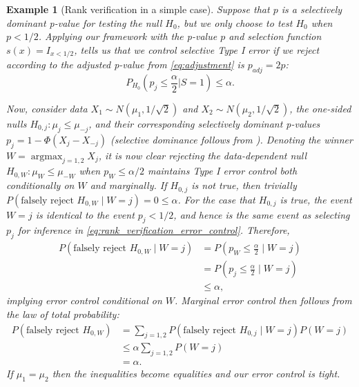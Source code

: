 \documentclass{article}
\DeclareMathOperator*{\argmax}{argmax}
\newtheorem{example}{Example}
\begin{document}
\begin{example}[Rank verification in a simple case]
\label{exm:rank_verification}
Suppose that $p$ is a selectively dominant p-value for testing the null $H_0$, but we only choose to test $H_0$ when $p < 1/2$. Applying our framework with the p-value $p$ and selection function $s(x) = I_{x < 1/2}$,  tells us that we control selective Type I error if we reject according to the adjusted p-value from \eqref{eq:adjustment} is $p_{adj} = 2p$:
\begin{equation}
    \label{eq:rank_verification_error_control}
    P_{H_{0}}\left(p_j \leq \frac{\alpha}{2} | S = 1\right) \leq \alpha.
\end{equation} 

Now, consider data $X_1 \sim N(\mu_1, 1/\sqrt{2})$ and $X_2 \sim N(\mu_2, 1/\sqrt{2})$, the one-sided nulls $H_{0, j}: \mu_j \leq \mu_{-j}$, and their corresponding selectively dominant p-values $p_j = 1 - \Phi(X_j - X_{-j})$ (selective dominance follows from ). Denoting the winner $W = \argmax_{j = 1, 2} X_j$, it is now clear rejecting the data-dependent null $H_{0, W}: \mu_W \leq \mu_{-W}$ when $p_{W} \leq \alpha/2$ maintains Type I error control both conditionally on $W$ and marginally. If $H_{0, j}$ is not true, then trivially $P(\text{falsely reject } H_{0, W} \mid W = j) = 0 \leq \alpha$. For the case that $H_{0, j}$ is true, the event $W=j$ is identical to the event $p_j < 1/2$, and hence is the same event as selecting $p_j$ for inference in \eqref{eq:rank_verification_error_control}. Therefore, 
\begin{align*}
    P(\text{falsely reject } H_{0, W} \mid W = j) &= P\left(p_W \leq \frac{\alpha}{2}  \mid W = j\right)\\
    &= P\left(p_j \leq \frac{\alpha}{2}  \mid W = j \right) \\
    &\leq \alpha,
\end{align*}
implying error control conditional on $W$. Marginal error control then follows from the law of total probability:
\begin{align*}
    P(\text{falsely reject } H_{0, W}) &= \sum_{j=1, 2} P(\text{falsely reject } H_{0, j} \mid W = j)P(W=j) \\
                                      &\leq \alpha \sum_{j = 1, 2} P(W=j)\\
                                      &=\alpha. 
\end{align*}
If $\mu_1 = \mu_2$ then the inequalities become equalities and our error control is tight. 
\end{example}
\end{document}
